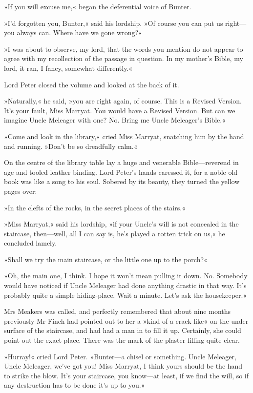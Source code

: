»If you will excuse me,« began the deferential voice of Bunter.

»I'd forgotten you, Bunter,« said his lordship. »Of course you can put us right—you always can. Where have we gone wrong?«

»I was about to observe, my lord, that the words you mention do not appear to agree with my recollection of the passage in question. In my mother's Bible, my lord, it ran, I fancy, somewhat differently.«

Lord Peter closed the volume and looked at the back of it.

»Naturally,« he said, »you are right again, of course. This is a Revised Version. It's your fault, Miss Marryat. You would have a Revised Version. But can we imagine Uncle Meleager with one? No. Bring me Uncle Meleager's Bible.«

»Come and look in the library,« cried Miss Marryat, snatching him by the hand and running. »Don't be so dreadfully calm.«

On the centre of the library table lay a huge and venerable Bible—reverend in age and tooled leather binding. Lord Peter's hands caressed it, for a noble old book was like a song to his soul. Sobered by its beauty, they turned the yellow pages over:

»In the clefts of the rocks, in the secret places of the stairs.«

»Miss Marryat,« said his lordship, »if your Uncle's will is not concealed in the staircase, then—well, all I can say is, he's played a rotten trick on us,« he concluded lamely.

»Shall we try the main staircase, or the little one up to the porch?«

»Oh, the main one, I think. I hope it won't mean pulling it down. No. Somebody would have noticed if Uncle Meleager had done anything drastic in that way. It's probably quite a simple hiding-place. Wait a minute. Let's ask the housekeeper.«

Mrs Meakers was called, and perfectly remembered that about nine months previously Mr Finch had pointed out to her a »kind of a crack like« on the under surface of the staircase, and had had a man in to fill it up. Certainly, she could point out the exact place. There was the mark of the plaster filling quite clear.

»Hurray!« cried Lord Peter. »Bunter—a chisel or something. Uncle Meleager, Uncle Meleager, we've got you! Miss Marryat, I think yours should be the hand to strike the blow. It's your staircase, you know—at least, if we find the will, so if any destruction has to be done it's up to you.«

